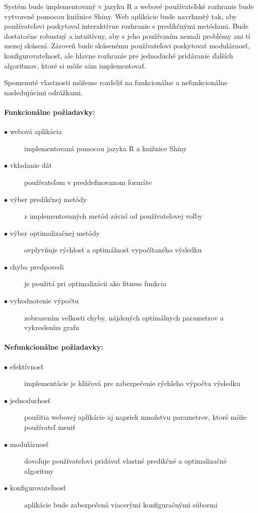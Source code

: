 \documentclass[a4paper,slovak,12pt,appendix]{article}
\begin{document}
Systém bude implementovaný v jazyku R a webové používateľské rozhranie bude
vytvorené pomocou knižnice Shiny. Web aplikácie bude navrhnutý tak, aby
používateľovi poskytoval interaktívne rozhranie s predikčnými metódami.
Bude dostatočne robustný a intuitívny, aby s jeho používaním nemali problémy
ani tí menej skúsení. Zároveň bude skúsenému používateľovi poskytovať
modulárnosť, konfigurovateľnosť, ale hlavne rozhranie pre jednoduché pridávanie
ďalších algoritmov, ktoré si môže sám implementovať.

Spomenuté vlastnosti môžeme rozdeliť na funkcionálne a nefunkcionálne
nasledujúcimi odrážkami.

\noindent
\paragraph{Funkcionálne požiadavky:}
\begin{description}
  \item[$\bullet$ webová aplikácia] implementovaná pomocou jazyka R a knižnice Shiny
  \item[$\bullet$ vkladanie dát] používateľom v preddefinovanom formáte
  \item[$\bullet$ výber predikčnej metódy] z implementovaných metód závisí od používateľovej voľby
  \item[$\bullet$ výber optimalizačnej metódy] ovplyvňuje rýchlosť a optimálnosť vypočítaného výsledku
  \item[$\bullet$ chyba predpovedi] je použitá pri optimalizácii ako fitness funkcia
  \item[$\bullet$ vyhodnotenie výpočtu] zobrazením veľkosti chyby, nájdených optimálnych parametrov a vykreslením grafu
\end{description}

\noindent
\paragraph{Nefunkcionálne požiadavky:}
\begin{description}
  \item[$\bullet$ efektívnosť] implementácie je kľúčová pre zabezpečenie rýchleho výpočtu výsledku
  \item[$\bullet$ jednoduchosť] použitia webovej aplikácie aj napriek množstvu parametrov, ktoré môže používateľ meniť
  \item[$\bullet$ modulárnosť] dovoľuje používateľovi pridávať vlastné predikčné a optimalizačné algoritmy
  \item[$\bullet$ konfigurovateľnosť] aplikácie bude zabezpečená viacerými konfiguračnými súbormi
\end{description}
\end{document}
